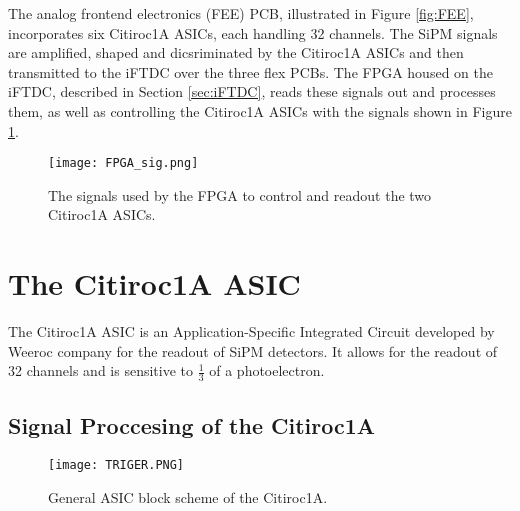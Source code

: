 The analog frontend electronics (FEE) PCB, illustrated in Figure \ref{fig:FEE}, incorporates six Citiroc1A ASICs, each handling 32 channels.
The SiPM signals are amplified, shaped and dicsriminated by the Citiroc1A ASICs  and then transmitted to the iFTDC over the three flex PCBs.
\newline
The FPGA housed on the iFTDC, described in Section \ref{sec:iFTDC},
reads these signals out and processes them, as well as controlling the Citiroc1A ASICs with the signals shown in Figure \ref{fig:FPGA_sigs}.\autocite{InternalcommunicationIgor}
\begin{figure}[H]
    \centering
    \texttt{[image: FPGA\_sig.png]}
    \caption{The signals used by the FPGA to control and readout the two Citiroc1A ASICs.\autocite{datasheetCITIROC}}
    \label{fig:FPGA_sigs}
\end{figure}


\section{The Citiroc1A ASIC}
The Citiroc1A ASIC is an Application-Specific Integrated Circuit developed by Weeroc company for the readout of SiPM detectors.
It allows for the readout of 32 channels and is sensitive to $\frac{1}{3}$ of a photoelectron.\autocite{datasheetCITIROC}
\subsection{Signal Proccesing of the Citiroc1A}
\begin{figure}[h]
    \centering
    \texttt{[image: TRIGER.PNG]}
    \caption{General ASIC block scheme of the Citiroc1A.\autocite{datasheetCITIROC}}
    \label{fig:CITIROC1A_TRIGEER}
\end{figure}

